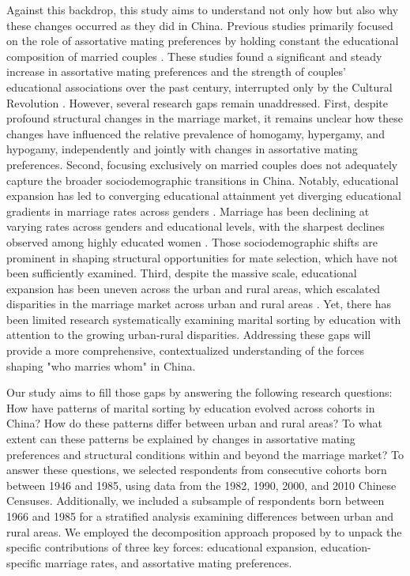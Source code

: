 Against this backdrop, this study aims to understand not only how but also why these changes occurred as they did in China. Previous studies primarily focused on the role of assortative mating preferences by holding constant the educational composition of married couples \parencite{dongTrendsEducationalAssortative2023,hanTrendsEducationalAssortative2010,huEducationalAgeAssortative2019,qianAssortativeMatingEducation2017}. These studies found a significant and steady increase in assortative mating preferences and the strength of couples' educational associations over the past century, interrupted only by the Cultural Revolution \parencite{dongTrendsEducationalAssortative2023,hanTrendsEducationalAssortative2010}. However, several research gaps remain unaddressed. First, despite profound structural changes in the marriage market, it remains unclear how these changes have influenced the relative prevalence of homogamy, hypergamy, and hypogamy, independently and jointly with changes in assortative mating preferences. Second, focusing exclusively on married couples does not adequately capture the broader sociodemographic transitions in China. Notably, educational expansion has led to converging educational attainment yet diverging educational gradients in marriage rates across genders \parencite{gruijtersTrendsEducationalMobility2019,yeungHigherEducationExpansion2013}. Marriage has been declining at varying rates across genders and educational levels, with the sharpest declines observed among highly educated women \parencite{huGenderEducationExpansion2023,raymoMarriageFamilyEast2015}. Those sociodemographic shifts are prominent in shaping structural opportunities for mate selection, which have not been sufficiently examined. Third, despite the massive scale, educational expansion has been uneven across the urban and rural areas, which escalated disparities in the marriage market across urban and rural areas \parencite{sicularBigExpansionRural2022,yeungHigherEducationExpansion2013}. Yet, there has been limited research systematically examining marital sorting by education with attention to the growing urban-rural disparities. Addressing these gaps will provide a more comprehensive, contextualized understanding of the forces shaping "who marries whom" in China.

Our study aims to fill those gaps by answering the following research questions: How have patterns of marital sorting by education evolved across cohorts in China? How do these patterns differ between urban and rural areas? To what extent can these patterns be explained by changes in assortative mating preferences and structural conditions within and beyond the marriage market? To answer these questions, we selected respondents from consecutive cohorts born between 1946 and 1985, using data from the 1982, 1990, 2000, and 2010 Chinese Censuses. Additionally, we included a subsample of respondents born between 1966 and 1985 for a stratified analysis examining differences between urban and rural areas. We employed the decomposition approach proposed by \textcite{leeschDecomposingTrendsEducational2023} to unpack the specific contributions of three key forces: educational expansion, education-specific marriage rates, and assortative mating preferences.

